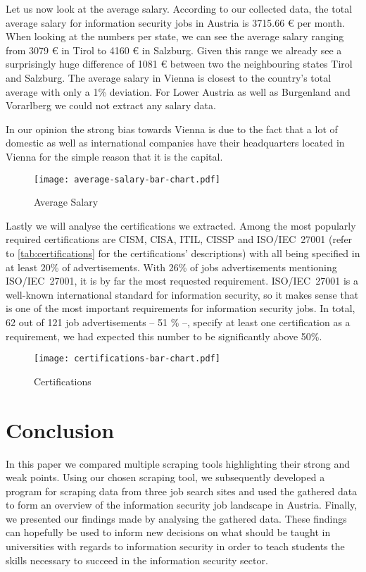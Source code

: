 \documentclass[runningheads]{llncs}
\begin{document}
Let us now look at the average salary. According to our collected data, the total average salary for information security jobs in Austria is 3715.66 € per month. When looking at the numbers per state, we can see the average salary ranging from 3079 € in Tirol to 4160 € in Salzburg. Given this range we already see a surprisingly huge difference of 1081 € between two the neighbouring states Tirol and Salzburg. The average salary in Vienna is closest to the country's total average with only a 1\% deviation. For Lower Austria as well as Burgenland and Vorarlberg we could not extract any salary data.

In our opinion the strong bias towards Vienna is due to the fact that a lot of domestic as well as international companies have their headquarters located in Vienna for the simple reason that it is the capital.

\begin{figure}[H]
	\centering
  \texttt{[image: average-salary-bar-chart.pdf]}
	\caption{Average Salary}
	\label{fig:salary_chart}
\end{figure}

Lastly we will analyse the certifications we extracted. Among the most popularly required certifications are CISM, CISA, ITIL, CISSP and ISO/IEC~27001 (refer to \autoref{tab:certifications} for the certifications' descriptions) with all being specified in at least 20\% of advertisements. With 26\% of jobs advertisements mentioning ISO/IEC~27001, it is by far the most requested requirement. ISO/IEC~27001 is a well-known international standard for information security, so it makes sense that is one of the most important requirements for information security jobs. In total, 62 out of 121 job advertisements -- 51 \% --, specify at least one certification as a requirement, we had expected this number to be significantly above 50\%.

\begin{figure}[H]
	\centering
  \texttt{[image: certifications-bar-chart.pdf]}
	\caption{Certifications}
	\label{fig:certifications_chart}
\end{figure}

\section{Conclusion}
\label{sec:conclusion}

In this paper we compared multiple scraping tools highlighting their strong and weak points. Using our chosen scraping tool, we subsequently developed a program for scraping data from three job search sites and used the gathered data to form an overview of the information security job landscape in Austria. Finally, we presented our findings made by analysing the gathered data. These findings can hopefully be used to inform new decisions on what should be taught in universities with regards to information security in order to teach students the skills necessary to succeed in the information security sector.
\end{document}
